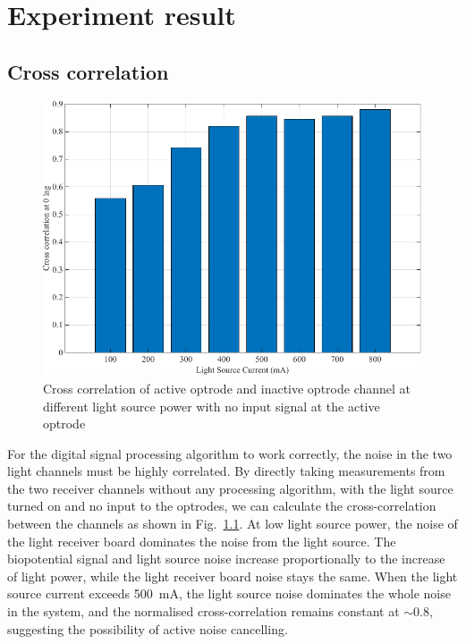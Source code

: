 \chapter[Experiment]{Experiment result} \label{c:tc2} 

\section{Cross correlation}

\begin{figure}[H]
\centerline{\includegraphics[scale=1]{5-Experiment/Cross correlation.pdf}}
\caption{Cross correlation of active optrode and inactive optrode channel at different light source power with no input signal at the active optrode}
\label{fig_Cross correlation}
\end{figure}

For the digital signal processing algorithm to work correctly, the noise in the two light channels must be highly correlated.  By directly taking measurements from the two receiver channels without any processing algorithm, with the light source turned on and no input to the optrodes, we can calculate the cross-correlation between the channels as shown in Fig.~\ref{fig_Cross correlation}.  At low light source power, the noise of the light receiver board dominates the noise from the light source.  The biopotential signal and light source noise increase proportionally to the increase of light power, while the light receiver board noise stays the same.  When the light source current exceeds \qty{500}{\mA}, the light source noise dominates the whole noise in the system, and the normalised cross-correlation remains constant at $\sim$0.8, suggesting the possibility of active noise cancelling.

